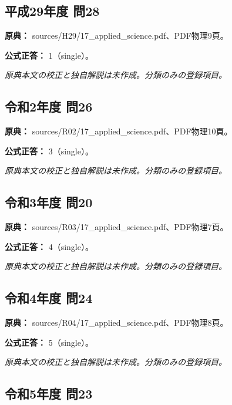 \subsection{平成29年度 問28}
\label{q:h29-reg-applied-28}

\noindent\textbf{原典：} sources/H29/17\_applied\_science.pdf、PDF物理9頁。

\textbf{公式正答：} 1（single）。

\par\textit{原典本文の校正と独自解説は未作成。分類のみの登録項目。}

\subsection{令和2年度 問26}
\label{q:r02-reg-applied-26}

\noindent\textbf{原典：} sources/R02/17\_applied\_science.pdf、PDF物理10頁。

\textbf{公式正答：} 3（single）。

\par\textit{原典本文の校正と独自解説は未作成。分類のみの登録項目。}

\subsection{令和3年度 問20}
\label{q:r03-reg-applied-20}

\noindent\textbf{原典：} sources/R03/17\_applied\_science.pdf、PDF物理7頁。

\textbf{公式正答：} 4（single）。

\par\textit{原典本文の校正と独自解説は未作成。分類のみの登録項目。}

\subsection{令和4年度 問24}
\label{q:r04-reg-applied-24}

\noindent\textbf{原典：} sources/R04/17\_applied\_science.pdf、PDF物理8頁。

\textbf{公式正答：} 5（single）。

\par\textit{原典本文の校正と独自解説は未作成。分類のみの登録項目。}

\subsection{令和5年度 問23}
\label{q:r05-reg-applied-23}

